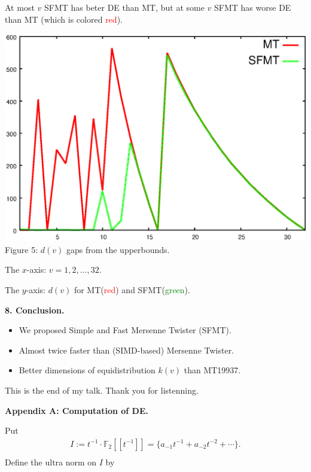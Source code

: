 \documentclass[a4j,12pt,landscape]{jarticle}
\def\F2{{\mathbb F}_2}
\begin{document}
At most $v$ SFMT has beter DE than MT, but at some $v$ SFMT
 has worse DE than MT
(which is colored \textcolor{red}{red}).
\newpage
\begin{center}
\includegraphics[width=0.8\linewidth,height=0.7\textheight,
keepaspectratio]{delta.eps}
\\
Figure 5: $d(v)$ gaps from the upperbounds.

The $x$-axis: $v=1,2,\ldots, 32$.

The $y$-axis: $d(v)$ for 
MT(\textcolor{red}{red}) and SFMT(\textcolor{green}{green}).
\end{center}

\newpage
{\bf 8. Conclusion.}
\begin{itemize}
\item We proposed Simple and Fast Mersenne Twister (SFMT). 
\item Almost twice faster than (SIMD-based) Mersenne Twister.
\item Better dimensions of equidistribution $k(v)$ than MT19937. 

\end{itemize}
\vspace{\fill}
\begin{center}
This is the end of my talk. Thank you for listenning.
\end{center}
\vskip 1cm

\newpage
{\bf Appendix A: Computation of DE.}

Put
$$
\begin{array}{l}
I:=t^{-1}\cdot \F2[[t^{-1}]]
=\{a_{-1}t^{-1}+a_{-2}t^{-2}+\cdots \}
. \\
\end{array}
$$
Define the ultra norm on $I$ by 
\end{document}
